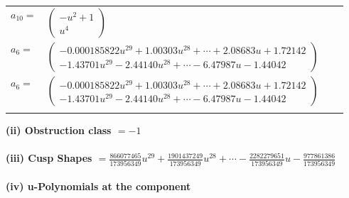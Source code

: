 \documentclass[1p]{elsarticle_modified}
\theoremstyle{definition}
\begin{document}
\begin{tabular}{m{7pt} m{180pt} m{7pt} m{180pt} }
\flushright $a_{10}=$&$\begin{pmatrix}- u^2+1\\u^4\end{pmatrix}$ \\
\flushright $a_{6}=$&$\begin{pmatrix}-0.000185822 u^{29}+1.00303 u^{28}+\cdots+2.08683 u+1.72142\\-1.43701 u^{29}-2.44140 u^{28}+\cdots-6.47987 u-1.44042\end{pmatrix}$\\ \flushright $a_{6}=$&$\begin{pmatrix}-0.000185822 u^{29}+1.00303 u^{28}+\cdots+2.08683 u+1.72142\\-1.43701 u^{29}-2.44140 u^{28}+\cdots-6.47987 u-1.44042\end{pmatrix}$\\&\end{tabular}
\flushleft \textbf{(ii) Obstruction class $= -1$}\\~\\
\flushleft \textbf{(iii) Cusp Shapes $= \frac{866077465}{173956349} u^{29}+\frac{1901437249}{173956349} u^{28}+\cdots-\frac{2282279651}{173956349} u-\frac{977861386}{173956349}$}\\~\\
\newpage\renewcommand{\arraystretch}{1}
\flushleft \textbf{(iv) u-Polynomials at the component}\newline \\
\end{document}
